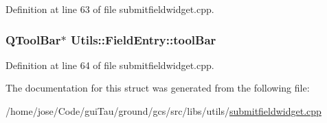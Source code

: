 Definition at line 63 of file submitfieldwidget.\-cpp.

\hypertarget{struct_utils_1_1_field_entry_a87467dace17a68b94a3815c9cbdd4a8c}{
\subsubsection[{tool\-Bar}]{\setlength{\rightskip}{0pt plus 5cm}Q\-Tool\-Bar$\ast$ Utils\-::\-Field\-Entry\-::tool\-Bar}}\label{struct_utils_1_1_field_entry_a87467dace17a68b94a3815c9cbdd4a8c}


Definition at line 64 of file submitfieldwidget.\-cpp.



The documentation for this struct was generated from the following file\-:\begin{DoxyCompactItemize}
\item 
/home/jose/\-Code/gui\-Tau/ground/gcs/src/libs/utils/\hyperlink{submitfieldwidget_8cpp}{submitfieldwidget.\-cpp}\end{DoxyCompactItemize}
